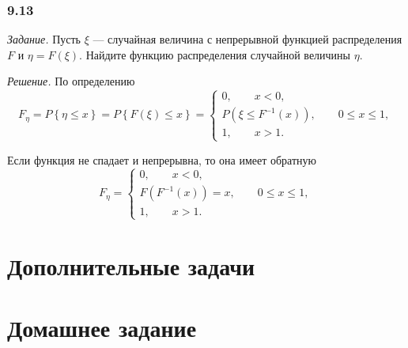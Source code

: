 \subsubsection*{9.13}

\textit{Задание.} Пусть $ \xi $ --- случайная величина с непрерывной функцией распределения $F$ и $ \eta = F \left( \xi \right) $.
Найдите функцию распределения случайной величины $ \eta $.

\textit{Решение.} По определению
$$F_{ \eta } =
P \left\{ \eta \leq x \right\} =
P \left\{ F \left( \xi \right) \leq x \right\} =
\begin{cases}
0, \qquad x < 0, \\
P \left( \xi \leq F^{-1} \left( x \right) \right), \qquad 0 \leq x \leq 1, \\
1, \qquad x > 1.
\end{cases}$$

Если функция не спадает и непрерывна, то она имеет обратную
$$F_{ \eta } =
\begin{cases}
0, \qquad x < 0, \\
F \left( F^{-1} \left( x \right) \right) = x, \qquad 0 \leq x \leq 1, \\
1, \qquad x > 1.
\end{cases}$$

\section*{Дополнительные задачи}

\section*{Домашнее задание}
